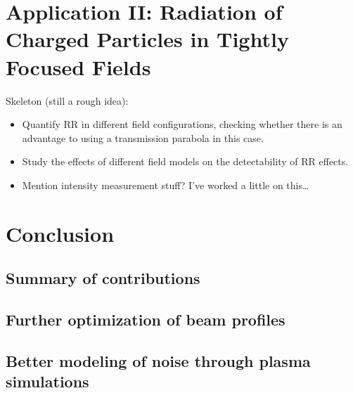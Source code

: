 \documentclass[11pt,SymmetricalJury]{inrsthesis/inrsthesis}
\begin{document}



\chapter{Application II: Radiation of Charged Particles in Tightly Focused Fields}
\label{chapter:electron_trajectories}

Skeleton (still a rough idea):
  \begin{itemize}
    \item Quantify RR in different field configurations, checking whether there
          is an advantage to using a transmission parabola in this case.
    \item Study the effects of different field models on the detectability of
          RR effects.
    \item Mention intensity measurement stuff? I've worked a little on this\ldots
  \end{itemize}



\chapter{Conclusion}

\section{Summary of contributions}

\section{Further optimization of beam profiles}

\section{Better modeling of noise through plasma simulations}
\end{document}

